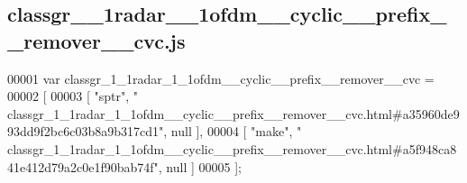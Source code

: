 \subsection{classgr\+\_\+\_\+1radar\+\_\+\_\+1ofdm\+\_\+\+\_\+cyclic\+\_\+\+\_\+prefix\+\_\+\+\_\+remover\+\_\+\+\_\+cvc.\+js}
\label{classgr__1__1radar__1__1ofdm____cyclic____prefix____remover____cvc_8js_source}

\begin{DoxyCode}
00001 var classgr_1_1radar_1_1ofdm__cyclic__prefix__remover__cvc =
00002 [
00003     [ \textcolor{stringliteral}{"sptr"}, \textcolor{stringliteral}{"
      classgr\_1\_1radar\_1\_1ofdm\_\_cyclic\_\_prefix\_\_remover\_\_cvc.html#a35960de993dd9f2bc6c03b8a9b317cd1"}, null ],
00004     [ \textcolor{stringliteral}{"make"}, \textcolor{stringliteral}{"
      classgr\_1\_1radar\_1\_1ofdm\_\_cyclic\_\_prefix\_\_remover\_\_cvc.html#a5f948ca841e412d79a2c0e1f90bab74f"}, null ]
00005 ];
\end{DoxyCode}
